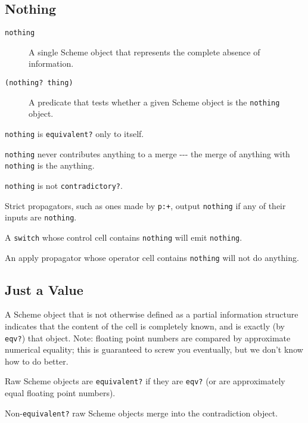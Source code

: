 \documentclass[12pt,letterpaper,english]{article}
\begin{document}

\subsection{Nothing}
\label{nothing}
\begin{description}
\item[{\texttt{nothing}}] \leavevmode 
A single Scheme object that represents the complete absence of
information.

\item[{\texttt{(nothing? thing)}}] \leavevmode 
A predicate that tests whether a given Scheme object is the \texttt{nothing}
object.

\end{description}

\texttt{nothing} is \texttt{equivalent?} only to itself.

\texttt{nothing} never contributes anything to a merge -{}-{}- the merge of
anything with \texttt{nothing} is the anything.

\texttt{nothing} is not \texttt{contradictory?}.

Strict propagators, such as ones made by \texttt{p:+}, output \texttt{nothing}
if any of their inputs are \texttt{nothing}.

A \texttt{switch} whose control cell contains \texttt{nothing} will emit
\texttt{nothing}.

An apply propagator whose operator cell contains \texttt{nothing} will not
do anything.



\subsection{Just a Value}
\label{just-a-value}

A Scheme object that is not otherwise defined as a partial information
structure indicates that the content of the cell is
completely known, and is exactly (by \texttt{eqv?}) that object.  Note:
floating point numbers are compared by approximate numerical equality;
this is guaranteed to screw you eventually, but we don't know how to
do better.

Raw Scheme objects are \texttt{equivalent?} if they are \texttt{eqv?} (or are
approximately equal floating point numbers).

Non-\texttt{equivalent?} raw Scheme objects merge into the contradiction object.
\end{document}
